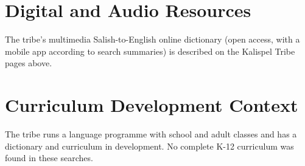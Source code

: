 \documentclass[12pt]{article}
\begin{document}
\section{Digital and Audio Resources}
The tribe's multimedia Salish-to-English online dictionary (open access, with a mobile app according to search summaries) is described on the Kalispel Tribe pages above.

\section{Curriculum Development Context}
The tribe runs a language programme with school and adult classes and has a dictionary and curriculum in development. No complete K-12 curriculum was found in these searches.
\end{document}
